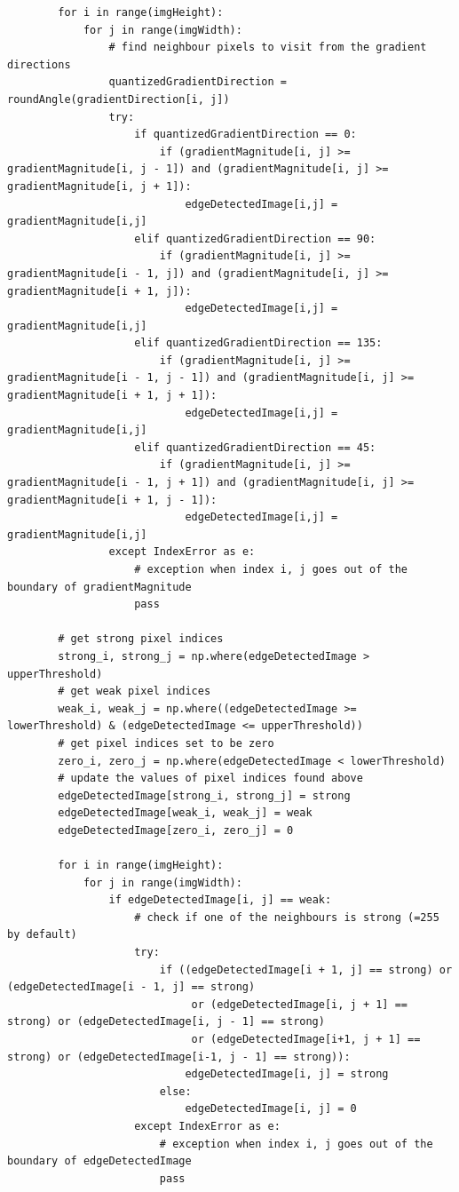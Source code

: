 \documentclass[letterpaper, 10 pt, conference]{ieeeconf}  %
\begin{document}
\begin{mdframed}
\begin{lstlisting}
        for i in range(imgHeight):
            for j in range(imgWidth):
                # find neighbour pixels to visit from the gradient directions
                quantizedGradientDirection = roundAngle(gradientDirection[i, j])
                try:
                    if quantizedGradientDirection == 0:
                        if (gradientMagnitude[i, j] >= gradientMagnitude[i, j - 1]) and (gradientMagnitude[i, j] >= gradientMagnitude[i, j + 1]):
                            edgeDetectedImage[i,j] = gradientMagnitude[i,j]
                    elif quantizedGradientDirection == 90:
                        if (gradientMagnitude[i, j] >= gradientMagnitude[i - 1, j]) and (gradientMagnitude[i, j] >= gradientMagnitude[i + 1, j]):
                            edgeDetectedImage[i,j] = gradientMagnitude[i,j]
                    elif quantizedGradientDirection == 135:
                        if (gradientMagnitude[i, j] >= gradientMagnitude[i - 1, j - 1]) and (gradientMagnitude[i, j] >= gradientMagnitude[i + 1, j + 1]):
                            edgeDetectedImage[i,j] = gradientMagnitude[i,j]
                    elif quantizedGradientDirection == 45:
                        if (gradientMagnitude[i, j] >= gradientMagnitude[i - 1, j + 1]) and (gradientMagnitude[i, j] >= gradientMagnitude[i + 1, j - 1]):
                            edgeDetectedImage[i,j] = gradientMagnitude[i,j]
                except IndexError as e:
                    # exception when index i, j goes out of the boundary of gradientMagnitude
                    pass
        
        # get strong pixel indices
        strong_i, strong_j = np.where(edgeDetectedImage > upperThreshold)
        # get weak pixel indices
        weak_i, weak_j = np.where((edgeDetectedImage >= lowerThreshold) & (edgeDetectedImage <= upperThreshold))
        # get pixel indices set to be zero
        zero_i, zero_j = np.where(edgeDetectedImage < lowerThreshold)
        # update the values of pixel indices found above
        edgeDetectedImage[strong_i, strong_j] = strong
        edgeDetectedImage[weak_i, weak_j] = weak
        edgeDetectedImage[zero_i, zero_j] = 0

        for i in range(imgHeight):
            for j in range(imgWidth):
                if edgeDetectedImage[i, j] == weak:
                    # check if one of the neighbours is strong (=255 by default)
                    try:
                        if ((edgeDetectedImage[i + 1, j] == strong) or (edgeDetectedImage[i - 1, j] == strong)
                             or (edgeDetectedImage[i, j + 1] == strong) or (edgeDetectedImage[i, j - 1] == strong)
                             or (edgeDetectedImage[i+1, j + 1] == strong) or (edgeDetectedImage[i-1, j - 1] == strong)):
                            edgeDetectedImage[i, j] = strong
                        else:
                            edgeDetectedImage[i, j] = 0
                    except IndexError as e:
                        # exception when index i, j goes out of the boundary of edgeDetectedImage
                        pass


\end{lstlisting}
\end{mdframed}
\end{document}
